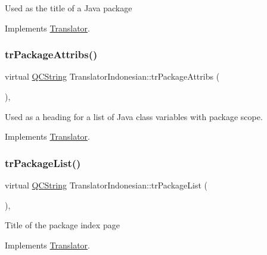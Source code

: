 Used as the title of a Java package 

Implements \mbox{\hyperlink{class_translator}{Translator}}.

\mbox{\label{class_translator_indonesian_a94747f6b09c77ef4c0e38e04a29196ad}} 
\subsubsection{\texorpdfstring{trPackageAttribs()}{trPackageAttribs()}}
{\footnotesize\ttfamily virtual \mbox{\hyperlink{class_q_c_string}{Q\+C\+String}} Translator\+Indonesian\+::tr\+Package\+Attribs (\begin{DoxyParamCaption}{ }\end{DoxyParamCaption})\hspace{0.3cm}{\ttfamily [inline]}, {\ttfamily [virtual]}}

Used as a heading for a list of Java class variables with package scope. 

Implements \mbox{\hyperlink{class_translator}{Translator}}.

\mbox{\label{class_translator_indonesian_a506ff9fef8613b4e8ac7eada40e37989}} 
\subsubsection{\texorpdfstring{trPackageList()}{trPackageList()}}
{\footnotesize\ttfamily virtual \mbox{\hyperlink{class_q_c_string}{Q\+C\+String}} Translator\+Indonesian\+::tr\+Package\+List (\begin{DoxyParamCaption}{ }\end{DoxyParamCaption})\hspace{0.3cm}{\ttfamily [inline]}, {\ttfamily [virtual]}}

Title of the package index page 

Implements \mbox{\hyperlink{class_translator}{Translator}}.

\mbox{\label{class_translator_indonesian_a7a475c758aef9631afc3f8701a330d4c}} 

